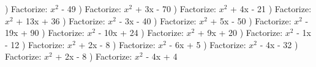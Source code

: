 \documentclass{article}%
\begin{document}
) Factorize: $x^2$ - 49%
\newline%
\newline%
) Factorize: $x^2$ + 3x - 70%
\newline%
\newline%
) Factorize: $x^2$ + 4x - 21%
\newline%
\newline%
) Factorize: $x^2$ + 13x + 36%
\newline%
\newline%
) Factorize: $x^2$ - 3x - 40%
\newline%
\newline%
) Factorize: $x^2$ + 5x - 50%
\newline%
\newline%
) Factorize: $x^2$ - 19x + 90%
\newline%
\newline%
) Factorize: $x^2$ - 10x + 24%
\newline%
\newline%
) Factorize: $x^2$ + 9x + 20%
\newline%
\newline%
) Factorize: $x^2$ - 1x - 12%
\newline%
\newline%
) Factorize: $x^2$ + 2x - 8%
\newline%
\newline%
) Factorize: $x^2$ - 6x + 5%
\newline%
\newline%
) Factorize: $x^2$ - 4x - 32%
\newline%
\newline%
) Factorize: $x^2$ + 2x - 8%
\newline%
\newline%
) Factorize: $x^2$ - 4x + 4%
\end{document}
